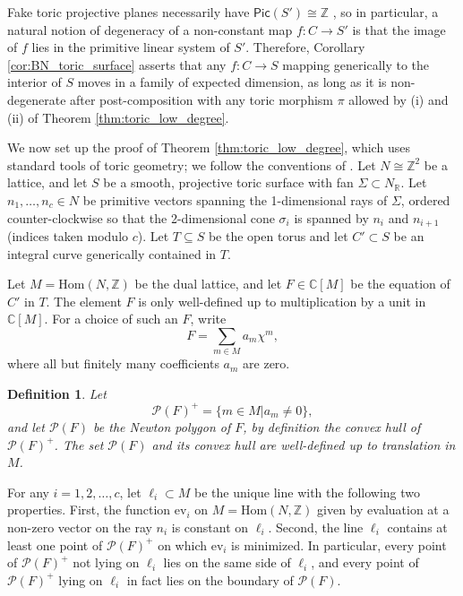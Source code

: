 \documentclass[12pt]{amsart}
\def\cP{\mathcal{P}}
\newtheorem{definition}{Definition}[section]
\newcommand{\Pic}{\mathsf{Pic}}
\newcommand{\ev}{{\text{ev}}}
\begin{document}
Fake toric projective planes necessarily have $\Pic(S')\cong\mathbb{Z}$ \cite[\S 3.4]{fulton_toric}, so in particular, a natural notion of degeneracy of a non-constant map $f:C\to S'$ is that the image of $f$ lies in the primitive linear system of $S'$. Therefore, Corollary \ref{cor:BN_toric_surface} asserts that any $f:C\to S$ mapping generically to the interior of $S$ moves in a family of expected dimension, as long as it is non-degenerate after post-composition with any toric morphism $\pi$ allowed by (i) and (ii) of Theorem \ref{thm:toric_low_degree}.

We now set up the proof of Theorem \ref{thm:toric_low_degree}, which uses standard tools of toric geometry; we follow the conventions of \cite{fulton_toric}. Let $N\cong\mathbb{Z}^2$ be a lattice, and let $S$ be a smooth, projective toric surface with fan $\Sigma\subset N_{\mathbb{R}}$. Let $n_1,\ldots,n_c\in N$ be primitive vectors spanning the 1-dimensional rays of $\Sigma$, ordered counter-clockwise so that the 2-dimensional cone $\sigma_i$ is spanned by $n_i$ and $n_{i+1}$ (indices taken modulo $c$). Let $T \subseteq S$ be the open torus and let $C' \subset S$ be an integral curve generically contained in $T$. 

Let $M=\text{Hom}(N,\mathbb{Z})$ be the dual lattice, and let $F\in \mathbb{C}[M]$ be the equation of $C'$ in $T$. The element $F$ is only well-defined up to multiplication by a unit in $\mathbb{C}[M]$. For a choice of such an $F$, write
   \begin{equation*}
       F=\sum_{m\in M}a_m\chi^m,
   \end{equation*}
   where all but finitely many coefficients $a_m$ are zero. 
   
   \begin{definition}
   Let
   \begin{equation*}
       \cP(F)^+=\{m\in M|a_m\neq 0\},
   \end{equation*}
   and let $\cP(F)$ be the \emph{Newton polygon} of $F$, by definition the convex hull of $\cP(F)^+$. The set $\cP(F)$ and its convex hull are well-defined up to translation in $M$.
   \end{definition}

   For any $i=1,2,\ldots,c$, let $\ell_i\subset M$ be the unique line with the following two properties. First, the function $\ev_i$ on $M=\text{Hom}(N,\mathbb{Z})$ given by evaluation at a non-zero vector on the ray $n_i$ is constant on $\ell_i$. Second, the line $\ell_i$ contains at least one point of $\cP(F)^+$ on which $\ev_i$ is minimized. In particular, every point of $\cP(F)^+$ not lying on $\ell_i$ lies on the same side of $\ell_i$, and every point of $\cP(F)^+$ lying on $\ell_i$ in fact lies on the boundary of $\cP(F)$.
   
\end{document}
